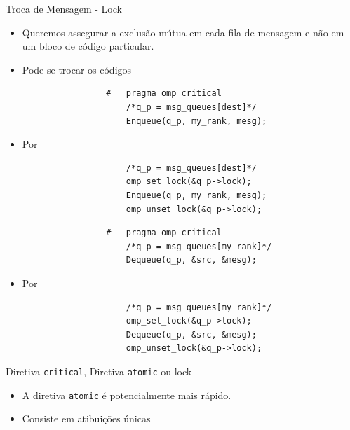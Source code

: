 	\begin{frame}[fragile]{Troca de Mensagem -  Lock}
		\begin{itemize}
			\item Queremos assegurar a exclusão mútua em cada fila de mensagem e não em um bloco de código particular.
			\item Pode-se trocar os códigos
		\end{itemize}

		\begin{multicols}{2}
				\begin{verbatim}
					#	pragma omp critical
						/*q_p = msg_queues[dest]*/
						Enqueue(q_p, my_rank, mesg);
				\end{verbatim}
			\begin{itemize}
				\item Por
			\end{itemize}
				\begin{verbatim}
						/*q_p = msg_queues[dest]*/
						omp_set_lock(&q_p->lock);
						Enqueue(q_p, my_rank, mesg);
						omp_unset_lock(&q_p->lock);
				\end{verbatim}
		\columnbreak
				\begin{verbatim}
					#	pragma omp critical
						/*q_p = msg_queues[my_rank]*/
						Dequeue(q_p, &src, &mesg);
				\end{verbatim}
			\begin{itemize}
				\item Por
			\end{itemize}
				\begin{verbatim}
						/*q_p = msg_queues[my_rank]*/
						omp_set_lock(&q_p->lock);
						Dequeue(q_p, &src, &mesg);
						omp_unset_lock(&q_p->lock);
				\end{verbatim}
		\end{multicols}
\end{frame}

	\begin{frame}{Diretiva {\tt critical}, Diretiva {\tt atomic} ou lock}
		\begin{itemize}
			\item A diretiva {\tt atomic} é potencialmente mais rápido.
			\item Consiste em atibuições únicas
		\end{itemize}
	\end{frame}



